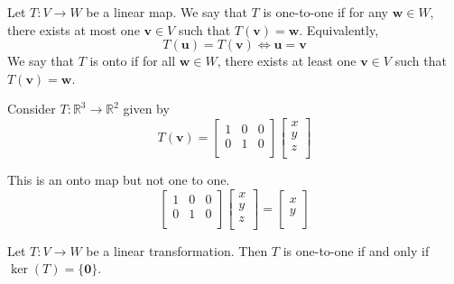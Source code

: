 \begin{definition}
    Let \(T:V\to W\) be a linear map. We say that \(T\) is one-to-one if for any \(\mathbf{w} \in W\), there exists at most one \(\mathbf{v} \in V\) such that \(T(\mathbf{v} )=\mathbf{w} \). Equivalently,
    \[
        T(\mathbf{u} )=T(\mathbf{v} )\iff \mathbf{u} =\mathbf{v} 
    \]
    We say that \(T\) is onto if for all \(\mathbf{w} \in W\), there exists at least one \(\mathbf{v} \in V\) such that \(T(\mathbf{v} )=\mathbf{w} \).
\end{definition}
\begin{exercise}
    Consider \(T:\mathbb{R} ^3 \to \mathbb{R} ^2\) given by 
    \[
        T(\mathbf{v} )=\begin{bmatrix}
            1 &0  &0   \\
             0&1  &0   \\
        \end{bmatrix} \begin{bmatrix}
             x \\
             y \\
             z \\
        \end{bmatrix}
    \]
\end{exercise}
\begin{solution}
    This is an onto map but not one to one.
    \[
        \begin{bmatrix}
            1 &0  &0   \\
             0&1  &0   \\
        \end{bmatrix} \begin{bmatrix}
             x \\
             y \\
             z \\
        \end{bmatrix} = \begin{bmatrix}
             x \\
             y \\
        \end{bmatrix}
    \]
\end{solution}
\begin{theorem}
    Let \(T:V\to W\) be a linear transformation. Then \(T\) is one-to-one if and only if \(\ker (T)=\{ \mathbf{0}  \} \).
\end{theorem}
